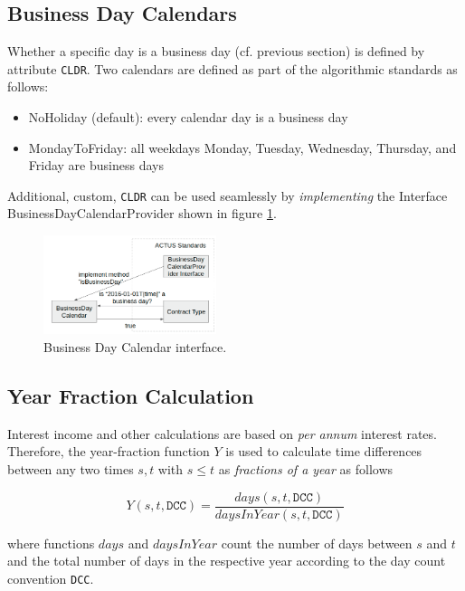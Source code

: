 \documentclass[9pt,oneside]{amsart}
\newcommand{\attr}[1]{\texttt{#1}}
\newcommand{\yfr}[2]{Y(#1,#2)}
\begin{document}
\begin{multicols}{2}
\subsection{Business Day Calendars}

Whether a specific day is a business day (cf. previous section) is defined by attribute \attr{CLDR}. Two calendars are defined as part of the algorithmic standards as follows:

\begin{itemize}
	\item[] NoHoliday (default): every calendar day is a business day

	\item[] MondayToFriday: all weekdays Monday, Tuesday, Wednesday, Thursday, and Friday are business days
\end{itemize}

Additional, custom, \attr{CLDR} can be used seamlessly by \textit{implementing} the Interface BusinessDayCalendarProvider shown in figure \ref{fig:bdc-interface}.

\begin{figure}[H]
	\centering
	\includegraphics[width=0.45\textwidth]{./media/bdc-interface.png}
	\caption{Business Day Calendar interface.}
	\label{fig:bdc-interface}
\end{figure}


\subsection{Year Fraction Calculation}

Interest income and other calculations are based on \textit{per annum} interest rates. Therefore, the year-fraction function $Y$ is used to calculate time differences between any two times $s,t$ with $s\leq t$ as \textit{fractions of a year} as follows

\[
	\yfr{s}{t,\attr{DCC}} = \frac{days(s,t,\attr{DCC})}{daysInYear(s,t,\attr{DCC})}
\]

where functions $days$ and $daysInYear$ count the number of days between $s$ and $t$ and the total number of days in the respective year according to the day count convention \attr{DCC}.\\


\end{multicols}
\end{document}
